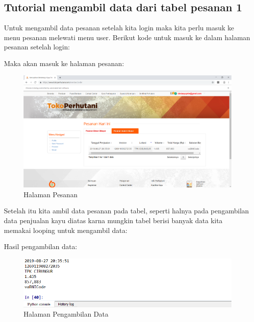 \subsection{Tutorial mengambil data dari tabel pesanan 1}
Untuk mengambil data pesanan setelah kita login maka kita perlu masuk ke menu pesanan melewati menu user.
Berikut kode untuk masuk ke dalam halaman pesanan setelah login:

Maka akan masuk ke halaman pesanan:
\begin{figure}[h]
	\centering
	\includegraphics[scale=0.30]{figures/8pesanan}
	\caption{Halaman Pesanan}
\end{figure}

Setelah itu kita ambil data pesanan pada tabel, seperti halnya pada pengambilan data penjualan kayu diatas karna mungkin tabel berisi banyak data kita memakai looping untuk mengambil data:

\newpage
Hasil pengambilan data:
\begin{figure}[h]
	\centering
	\includegraphics[scale=0.55]{figures/8datapesan}
	\caption{Halaman Pengambilan Data}
\end{figure}


\newpage
